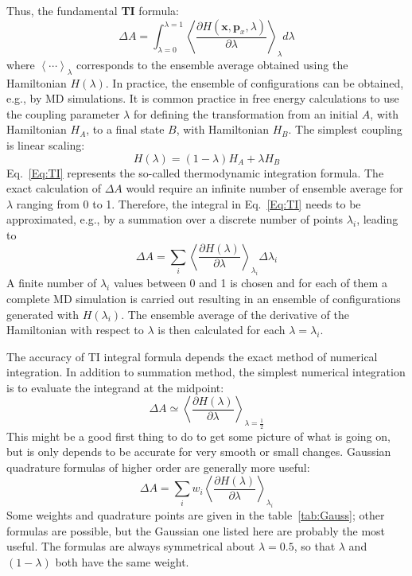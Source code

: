 Thus, the fundamental \textbf{TI} formula:
\begin{equation}
\Delta A = \int_{\lambda=0}^{\lambda=1}\left \langle \frac{\partial{H(\textbf{x},\textbf{p}_{x},\lambda)}}{\partial{\lambda}} \right \rangle_{\lambda} d\lambda
\label{Eq:TI}
\end{equation} 
where $\left \langle \cdots \right \rangle _{\lambda}$ corresponds to the ensemble average obtained using the Hamiltonian $H(\lambda)$. In practice, the ensemble of configurations can be obtained, e.g., by MD simulations. It is common practice in free energy calculations to use the coupling parameter $\lambda$ for defining the transformation from an initial $A$, with Hamiltonian $H_{A}$, to a final state $B$, with Hamiltonian $H_{B}$. The simplest coupling is linear scaling:
\begin{equation}
H(\lambda) = (1-\lambda) H_{A} + \lambda H_{B}
\end{equation}
Eq.~\ref{Eq:TI} represents the so-called thermodynamic integration formula. The exact calculation of $\Delta A$ would require an infinite number of ensemble average for $\lambda$ ranging from 0 to 1.
Therefore, the integral in Eq.~\ref{Eq:TI} needs to be approximated, e.g., by a summation over a discrete number of points $\lambda_{i}$, \cite{MordasiniJPCB2000} leading to 
\begin{equation}
\Delta A = \sum_{i}^{}\left \langle \frac{\partial{H(\lambda)}}{\partial{\lambda}} \right \rangle_{\lambda_{i}} \Delta\lambda_{i}
\label{Eq:dTI}
\end{equation} 
A finite number of $\lambda_{i}$ values between 0 and 1 is chosen and for each of them a complete MD simulation is carried out resulting in an ensemble of configurations generated with $H(\lambda_{i})$.
The ensemble average of the derivative of the Hamiltonian with respect to $\lambda$ is then calculated for each $\lambda = \lambda_{i}$.
	
The accuracy of TI integral formula depends the exact method of numerical integration. In addition to summation method, the simplest numerical integration is to evaluate the integrand at the midpoint:
\begin{equation}
\Delta A \simeq \left \langle \frac{\partial{H(\lambda)}}{\partial{\lambda}} \right \rangle_{\lambda=\frac{1}{2}}
\label{Eq:TI1}
\end{equation} 
This might be a good first thing to do to get some picture of what is going on, but is only depends to be accurate for very smooth or small changes. Gaussian quadrature formulas of higher order are generally more useful:
\begin{equation}
\Delta A = \sum_{i}^{} w_{i}\left \langle \frac{\partial{H(\lambda)}}{\partial{\lambda}} \right \rangle_{\lambda_{i}}
\label{Eq:Gauss}
\end{equation} 
Some weights and quadrature points are given in the table~\ref{tab:Gauss}; other formulas are possible, \cite{HummerJCP1996} but the Gaussian one listed here are probably the most useful. The formulas are always symmetrical about $\lambda = 0.5$, so that $\lambda$ and $(1-\lambda)$ both have the same weight.
	
